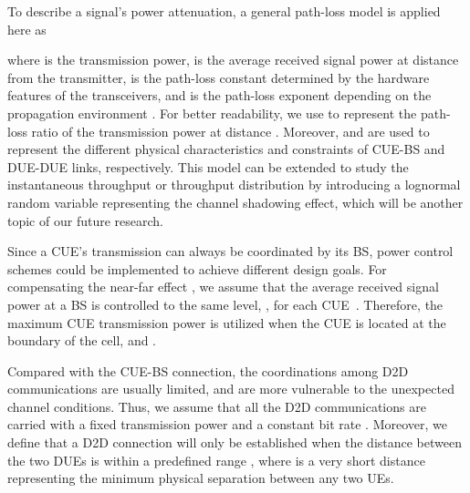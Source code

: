 \documentclass[journal, 10pt]{IEEEtran}
\begin{document}
To describe a signal's power attenuation, a general path-loss 
model is applied here as
 
where  is the transmission power,  is the
average received signal power at distance  from the transmitter,
 is the path-loss constant determined by the hardware features
of the transceivers, and  is the path-loss exponent depending
on the propagation environment \cite{Rappaport:01Book}. For better
readability, we use  to represent the path-loss ratio of the
transmission power at distance . Moreover,  and
 are used to represent the different physical
characteristics and constraints of CUE-BS and DUE-DUE links,
respectively. This model can be extended to study the instantaneous
throughput or throughput distribution by introducing a lognormal
random variable representing the channel shadowing effect, which will
be another topic of our future research.


Since a CUE's transmission can always be coordinated by its BS, power
control schemes could be implemented to achieve different design
goals. For compensating the near-far effect , we assume that the average
received signal power at a BS is controlled to the same level,
, for each CUE~\cite{Min:11TWC-b}. Therefore, the
maximum CUE transmission power  is utilized
when the CUE is located at the boundary of the cell, and .


Compared with the CUE-BS connection, the coordinations among D2D
communications are usually limited, and are more vulnerable to the
unexpected channel conditions. Thus, we assume that all the D2D
communications are carried with a fixed transmission power
 and a constant bit rate . Moreover, we define
that a D2D connection will only be established when the distance
 between the two DUEs is within a predefined range
, where  is a very short distance
representing the minimum physical separation between any two UEs.
\end{document}
